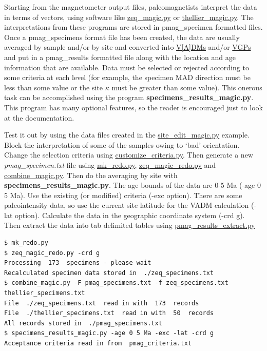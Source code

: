 \documentclass[11pt]{book}
\begin{document}
{Starting from the magnetometer output files, paleomagnetists interpret the data in terms of vectors, using software like \href{#zeq_magic.py}{zeq\_magic.py} or \href{thellier_magic.py}{thellier\_magic.py}.  The interpretations from these programs are stored in pmag\_specimen formatted files.
Once a pmag\_specimens format file has been created, the data are usually  averaged by sample and/or by site and converted into \href{http://earthref.org/MAGIC/books/Tauxe/Essentials/WebBook3ch2.html#Virtual_dipole_moment}{V[A]DMs} and/or
\href{http://earthref.org/MAGIC/books/Tauxe/Essentials/WebBook3ch2.html#Virtual_geomagnetic_poles}{VGPs} and put in a pmag\_results formatted file along with the location and age information that are available.  Data must be selected or rejected according to some criteria at each level (for example, the specimen MAD direction must be less than some value or the site $\kappa$ must be greater than some value).   This onerous task can be accomplished using the program {\bf specimens\_results\_magic.py}.          This program has many optional features, so the reader is encouraged just to look at the documentation.

Test it out  by using the data files created in the \href{#site_edit_magic.py}{site\_edit\_magic.py} example.  Block the interpretation of some of the samples owing to `bad' orientation.  Change the selection criteria using \href{customize_criteria.py}{customize\_criteria.py}.    Then generate a new {\it pmag\_specimen.txt} file using \href{#mk_redo.py}{mk\_redo.py},  \href{#zeq_magic_redo.py}{zeq\_magic\_redo.py} and \href{#combine_magic.py}{combine\_magic.py}.   Then do the averaging by site with {\bf specimens\_results\_magic.py}.  The age bounds of the data are 0-5 Ma (-age 0 5 Ma).  Use the existing (or modified) criteria (-exc option).   There are some paleointensity data, so use the current site latitude for the VADM  calculation (-lat option).   Calculate the data in the geographic coordinate system (-crd g).    Then extract the data into tab delimited tables using \href{#pmag_results_extract.py}{pmag\_results\_extract.py}

\begin{verbatim}
$ mk_redo.py
$ zeq_magic_redo.py -crd g
Processing  173  specimens - please wait
Recalculated specimen data stored in  ./zeq_specimens.txt
$ combine_magic.py -F pmag_specimens.txt -f zeq_specimens.txt thellier_specimens.txt
File  ./zeq_specimens.txt  read in with  173  records
File  ./thellier_specimens.txt  read in with  50  records
All records stored in  ./pmag_specimens.txt
$ specimens_results_magic.py -age 0 5 Ma -exc -lat -crd g
Acceptance criteria read in from  pmag_criteria.txt


\end{verbatim}}
\end{document}
